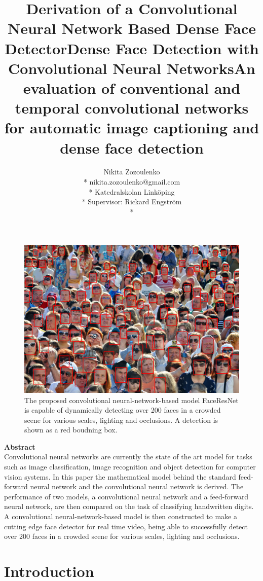 \documentclass[a4paper, twoside]{article}
\title{Derivation of a Convolutional Neural Network Based Dense Face Detector}
\title{Dense Face Detection with Convolutional Neural Networks}
\title{An evaluation of conventional and temporal convolutional networks for automatic image captioning and dense face detection}
\author{Nikita Zozoulenko \\*
nikita.zozoulenko@gmail.com \\*
Katedralskolan Linköping\\*
Supervisor: Rickard Engström \\*}
\begin{document}
\maketitle

\vfill
\begin{figure}[h]
	\centering
  		\includegraphics[scale=0.221]{resultscrowd2.png}
  	\caption{The proposed convolutional neural-network-based model FaceResNet is capable of dynamically detecting over 200 faces in a crowded scene for various scales, lighting and occlusions. A detection is shown as a red boudning box.} \label{crowd}
\end{figure}
\vfill

\newpage

\Large{\textbf{Abstract}}\\

Convolutional neural networks are currently the state of the art model for tasks such as image classification, image recognition and object detection for computer vision systems. In this paper the mathematical model behind the standard feed-forward neural network and the convolutional neural network is derived. The performance of two models, a convolutional neural network and a feed-forward neural network, are then compared on the task of classifying handwritten digits. A convolutional neural-network-based model is then constructed to make a cutting edge face detector for real time video, being able to successfully detect over 200 faces in a crowded scene for various scales, lighting and occlusions.
\newpage

\tableofcontents
\newpage
\section{Introduction}
\end{document}
